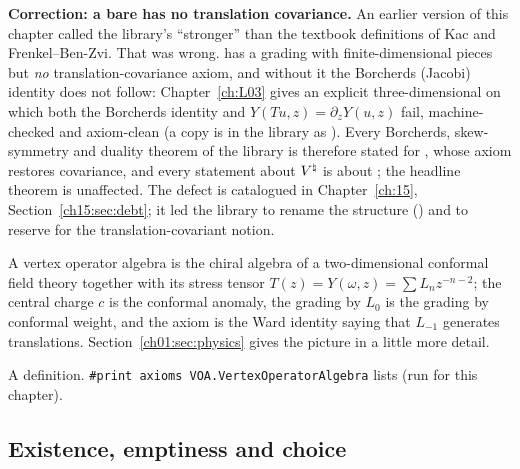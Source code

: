 \begin{warning}
\textbf{Correction: a bare  has no translation covariance.} An earlier version
of this chapter called the library's  ``stronger'' than the textbook
definitions of Kac and Frenkel--Ben-Zvi. That was wrong.  has a grading with
finite-dimensional pieces but \emph{no} translation-covariance axiom, and without it the Borcherds
(Jacobi) identity does not follow: Chapter~\ref{ch:L03} gives an explicit three-dimensional
 on which both the Borcherds identity and $Y(Tu,z) = \partial_zY(u,z)$ fail,
machine-checked and axiom-clean (a copy is in the library as
).
Every Borcherds, skew-symmetry and duality theorem of the library is therefore stated for
, whose axiom  restores covariance, and every
statement about ${V^{\natural}}$ is about ; the headline theorem is unaffected.
The defect is catalogued in Chapter~\ref{ch:15}, Section~\ref{ch15:sec:debt}; it led the library to rename the structure () and to reserve  for the translation-covariant notion.
\end{warning}

\begin{physics}
A vertex operator algebra is the chiral algebra of a two-dimensional conformal field theory together
with its stress tensor $T(z) = Y(\omega,z) = \sum L_nz^{-n-2}$; the central charge $c$ is the
conformal anomaly, the grading by $L_0$ is the grading by conformal weight, and the axiom
 is the Ward identity saying that $L_{-1}$ generates translations.
Section~\ref{ch01:sec:physics} gives the picture in a little more detail.
\end{physics}

\begin{status}
A definition. \texttt{\#print axioms VOA.VertexOperatorAlgebra} lists
 (run for this chapter).
\end{status}

\subsection{Existence, emptiness and choice}\label{ch01:sec:choice}

